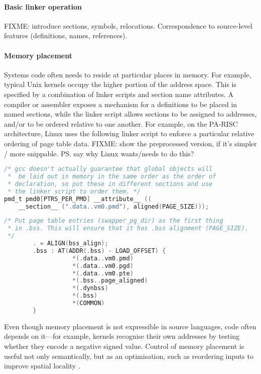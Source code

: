 \paragraph{Basic linker operation}
FIXME: introduce sections, symbols, relocations.
Correspondence to source-level features (definitions, names, references).

\paragraph{Memory placement}
Systems code often needs to reside at particular places in memory.
For example, typical Unix kernels occupy the higher portion of the address space.
This is specified by a combination of linker scripts and section name attributes. 
A compiler or assembler exposes a mechanism for a definitions to be placed in named sections,
while the linker script allows sections to be assigned to addresses, 
and/or to be ordered relative to one another.
For example, on the PA-RISC architecture, Linux uses the following 
linker script to enforce a particular relative ordering of page table data.
FIXME: show the preprocessed version, if it's simpler / more snippable.
\ps{say why Linux wants/needs to do this?}

{\scriptsize\begin{lstlisting}[language=C,columns=flexible,basicstyle=\sffamily]
/* gcc doesn't actually guarantee that global objects will
 *  be laid out in memory in the same order as the order of 
 * declaration, so put these in different sections and use
 * the linker script to order them. */
pmd_t pmd0[PTRS_PER_PMD] __attribute__ ((
    __section__ (".data..vm0.pmd"), aligned(PAGE_SIZE)));
\end{lstlisting}}

{\scriptsize\begin{lstlisting}[language=C,columns=flexible,basicstyle=\sffamily]
/* Put page table entries (swapper_pg_dir) as the first thing 
 * in .bss. This will ensure that it has .bss alignment (PAGE_SIZE).
 */
        . = ALIGN(bss_align);                
        .bss : AT(ADDR(.bss) - LOAD_OFFSET) {
                   *(.data..vm0.pmd)
                   *(.data..vm0.pgd)
                   *(.data..vm0.pte)
                   *(.bss..page_aligned)     
                   *(.dynbss)                
                   *(.bss)                   
                   *(COMMON)                 
        }
\end{lstlisting}}

Even though memory placement is not expressible in source languages, 
code often depends on it---for example, kernels recognise their own addresses
by testing whether they encode a negative signed value.
Control of memory placement is useful not only semantically, 
but as an optimisation, such as 
reordering inputs to improve spatial locality \citep{orr_dynamic_1994}.

